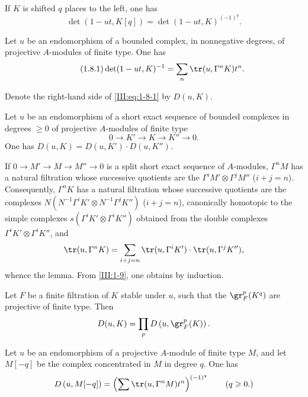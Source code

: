 \documentclass[oneside]{book}
\begin{document}
If $K$ is shifted $q$ places to the left, one has
\[
  \det(1-u t,K[q]) = \det(1-u t,K)^{(-1)^q} \text{.}
\]






\begin{proposition_}\label{III:1-8}
Let $u$ be an endomorphism of a bounded complex, in nonnegative degrees, of
projective $A$-modules of finite type. One has \
\begin{equation*}\tag{1.8.1}\label{III:eq:1-8-1}
  \det(1-u t,K)^{-1} = \sum_n \tr(u,\Gamma^n K) t^n \text{.}
\end{equation*}
\end{proposition_}

Denote the right-hand side of \eqref{III:eq:1-8-1} by $D(u,K)$.






\begin{lemma_}\label{III:1-9}
Let $u$ be an endomorphism of a short exact sequence of bounded complexes in
degrees $\geqslant 0$ of projective $A$-modules of finite type
\[
  0 \to K' \to K \to K'' \to 0 \text{.}
\]
One has $D(u,K)=D(u,K')\cdot D(u,K'')$.
\end{lemma_}

If $0\to M'\to M\to M''\to 0$ is a split short exact sequence of
$A$-modules, $\Gamma^n M$ has a natural filtration whose successive quotients
are the $\Gamma^i M'\otimes \Gamma^j M''$ ($i+j=n$). Consequently,
$\Gamma^n K$ has a natural filtration whose successive quotients are the
complexes $N(N^{-1} \Gamma^i K'\otimes N^{-1}\Gamma^j K'')$ ($i+j=n$),
canonically homotopic to the simple complexes
$s(\Gamma^i K'\otimes \Gamma^i K'')$ obtained from the double complexes
$\Gamma^i K'\otimes \Gamma^i K''$, and
\[
  \tr(u,\Gamma^n K) = \sum_{i+j=n} \tr(u,\Gamma^i K')\cdot \tr(u,\Gamma^j K'') \text{,}
\]
whence the lemma. From \ref{III:1-9}, one obtains by induction.






\begin{lemma_}\label{III:1-10}
Let $F$ be a finite filtration of $K$ stable under $u$, such that the
$\gr_F^p(K^q)$ are projective of finite type. Then
\[
  D(u,K) = \prod_p D\left(u,\gr_F^p(K)\right) \text{.}
\]
\end{lemma_}






\begin{lemma_}\label{III:1-11}
Let $u$ be an endomorphism of a projective $A$-module of finite type $M$, and
let $M[-q]$ be the complex concentrated in $M$ in degree $q$. One has
\[
  D\left(u,M[-q]\right) = \left(\sum \tr(u,\Gamma^n M) t^n\right)^{(-1)^q} \qquad \text{($q\geqslant 0$.)}
\]
\end{lemma_}
\end{document}
